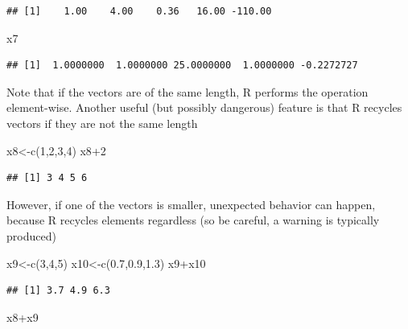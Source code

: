 \documentclass[
]{article}
\newenvironment{Shaded}{\begin{snugshade}}{\end{snugshade}}
\newcommand{\DecValTok}[1]{\textcolor[rgb]{0.00,0.00,0.81}{#1}}
\newcommand{\FloatTok}[1]{\textcolor[rgb]{0.00,0.00,0.81}{#1}}
\newcommand{\FunctionTok}[1]{\textcolor[rgb]{0.00,0.00,0.00}{#1}}
\newcommand{\NormalTok}[1]{#1}
\newcommand{\OtherTok}[1]{\textcolor[rgb]{0.56,0.35,0.01}{#1}}
\newcommand{\SpecialCharTok}[1]{\textcolor[rgb]{0.00,0.00,0.00}{#1}}
\begin{document}
\begin{verbatim}
## [1]    1.00    4.00    0.36   16.00 -110.00
\end{verbatim}

\begin{Shaded}
\begin{Highlighting}[]
\NormalTok{x7}
\end{Highlighting}
\end{Shaded}

\begin{verbatim}
## [1]  1.0000000  1.0000000 25.0000000  1.0000000 -0.2272727
\end{verbatim}

Note that if the vectors are of the same length, R performs the
operation element-wise. Another useful (but possibly dangerous) feature
is that R recycles vectors if they are not the same length

\begin{Shaded}
\begin{Highlighting}[]
\NormalTok{x8}\OtherTok{\textless{}{-}}\FunctionTok{c}\NormalTok{(}\DecValTok{1}\NormalTok{,}\DecValTok{2}\NormalTok{,}\DecValTok{3}\NormalTok{,}\DecValTok{4}\NormalTok{)}
\NormalTok{x8}\SpecialCharTok{+}\DecValTok{2}
\end{Highlighting}
\end{Shaded}

\begin{verbatim}
## [1] 3 4 5 6
\end{verbatim}

However, if one of the vectors is smaller, unexpected behavior can
happen, because R recycles elements regardless (so be careful, a warning
is typically produced)

\begin{Shaded}
\begin{Highlighting}[]
\NormalTok{x9}\OtherTok{\textless{}{-}}\FunctionTok{c}\NormalTok{(}\DecValTok{3}\NormalTok{,}\DecValTok{4}\NormalTok{,}\DecValTok{5}\NormalTok{)}
\NormalTok{x10}\OtherTok{\textless{}{-}}\FunctionTok{c}\NormalTok{(}\FloatTok{0.7}\NormalTok{,}\FloatTok{0.9}\NormalTok{,}\FloatTok{1.3}\NormalTok{)}
\NormalTok{x9}\SpecialCharTok{+}\NormalTok{x10}
\end{Highlighting}
\end{Shaded}

\begin{verbatim}
## [1] 3.7 4.9 6.3
\end{verbatim}

\begin{Shaded}
\begin{Highlighting}[]
\NormalTok{x8}\SpecialCharTok{+}\NormalTok{x9}
\end{Highlighting}
\end{Shaded}
\end{document}
